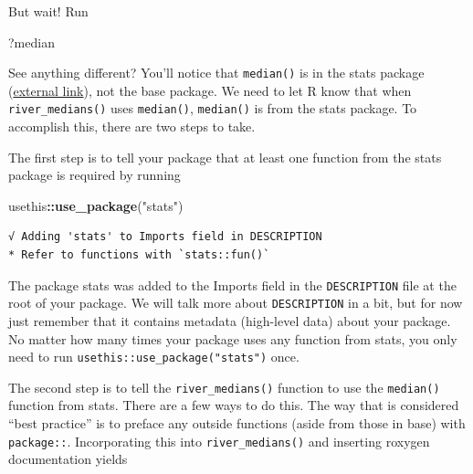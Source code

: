 \documentclass[
]{book}
\newenvironment{Shaded}{\begin{snugshade}}{\end{snugshade}}
\newcommand{\KeywordTok}[1]{\textcolor[rgb]{0.13,0.29,0.53}{\textbf{#1}}}
\newcommand{\NormalTok}[1]{#1}
\newcommand{\OperatorTok}[1]{\textcolor[rgb]{0.81,0.36,0.00}{\textbf{#1}}}
\newcommand{\StringTok}[1]{\textcolor[rgb]{0.31,0.60,0.02}{#1}}
\begin{document}
But wait! Run

\begin{Shaded}
\begin{Highlighting}[]
\NormalTok{?median}
\end{Highlighting}
\end{Shaded}

See anything different? You'll notice that \texttt{median()} is in the stats package (\href{https://stat.ethz.ch/R-manual/R-devel/library/stats/html/00Index.html}{external link}), not the base package. We need to let R know that when \texttt{river\_medians()} uses \texttt{median()}, \texttt{median()} is from the stats package. To accomplish this, there are two steps to take.

The first step is to tell your package that at least one function from the stats package is required by running

\begin{Shaded}
\begin{Highlighting}[]
\NormalTok{usethis}\OperatorTok{::}\KeywordTok{use_package}\NormalTok{(}\StringTok{"stats"}\NormalTok{)}
\end{Highlighting}
\end{Shaded}

\begin{verbatim}
√ Adding 'stats' to Imports field in DESCRIPTION
* Refer to functions with `stats::fun()`
\end{verbatim}

The package stats was added to the Imports field in the \texttt{DESCRIPTION} file at the root of your package. We will talk more about \texttt{DESCRIPTION} in a bit, but for now just remember that it contains metadata (high-level data) about your package. No matter how many times your package uses any function from stats, you only need to run \texttt{usethis::use\_package("stats")} once.

The second step is to tell the \texttt{river\_medians()} function to use the \texttt{median()} function from stats. There are a few ways to do this. The way that is considered ``best practice'' is to preface any outside functions (aside from those in base) with \texttt{package::}. Incorporating this into \texttt{river\_medians()} and inserting roxygen documentation yields
\end{document}
